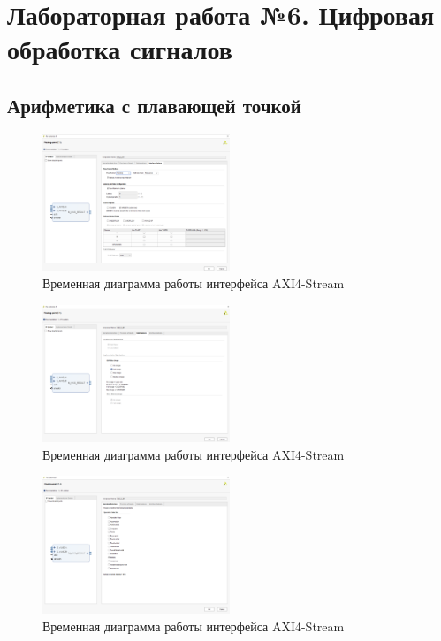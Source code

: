 \documentclass[a4paper,oneside ,14pt]{extreport}
\begin{document}
\chapter{Лабораторная работа №6. Цифровая обработка сигналов}



\section{Арифметика с плавающей точкой}

\begin{figure}[h]
	\centering
	\includegraphics[width=0.5\textwidth]{image/fp_interface_options.png}
	\caption{Временная диаграмма работы интерфейса AXI4-Stream}
	\label{fp_interface_options}
\end{figure}

\begin{figure}[h]
	\centering
	\includegraphics[width=0.5\textwidth]{image/fp_optimizations.png}
	\caption{Временная диаграмма работы интерфейса AXI4-Stream}
	\label{fp_optimizations}
\end{figure}

\begin{figure}[h]
	\centering
	\includegraphics[width=0.5\textwidth]{image/fp_selection_tab.png}
	\caption{Временная диаграмма работы интерфейса AXI4-Stream}
	\label{fp_selection_tab}
\end{figure}
\end{document}
